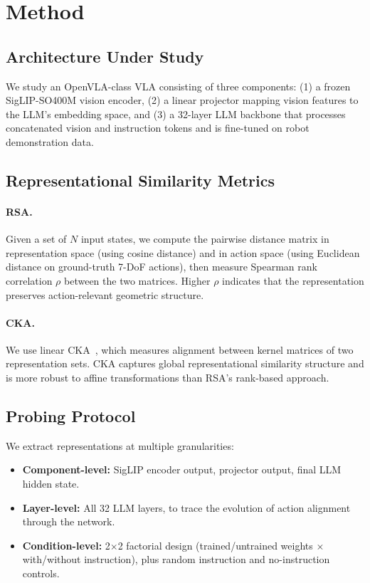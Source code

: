 \documentclass[letterpaper]{article}
\begin{document}
\section{Method}
\label{sec:method}

\subsection{Architecture Under Study}

We study an OpenVLA-class VLA consisting of three components:
(1) a frozen SigLIP-SO400M vision encoder,
(2) a linear projector mapping vision features to the LLM's embedding space, and
(3) a 32-layer LLM backbone that processes concatenated vision and instruction tokens and is fine-tuned on robot demonstration data.

\subsection{Representational Similarity Metrics}

\paragraph{RSA.}
Given a set of $N$ input states, we compute the pairwise distance matrix in representation space (using cosine distance) and in action space (using Euclidean distance on ground-truth 7-DoF actions), then measure Spearman rank correlation $\rho$ between the two matrices.
Higher $\rho$ indicates that the representation preserves action-relevant geometric structure.

\paragraph{CKA.}
We use linear CKA~\citep{kornblith2019cka}, which measures alignment between kernel matrices of two representation sets.
CKA captures global representational similarity structure and is more robust to affine transformations than RSA's rank-based approach.

\subsection{Probing Protocol}

We extract representations at multiple granularities:
\begin{itemize}
  \item \textbf{Component-level:} SigLIP encoder output, projector output, final LLM hidden state.
  \item \textbf{Layer-level:} All 32 LLM layers, to trace the evolution of action alignment through the network.
  \item \textbf{Condition-level:} 2$\times$2 factorial design (trained/untrained weights $\times$ with/without instruction), plus random instruction and no-instruction controls.
\end{itemize}
\end{document}
